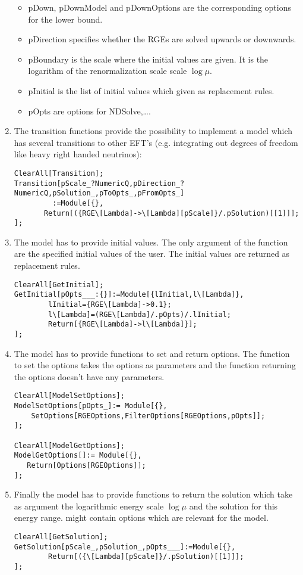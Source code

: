\begin{enumerate}
\begin{itemize}
    \item pDown, pDownModel and pDownOptions are the corresponding options for
    the lower bound.
  \item pDirection specifies whether the RGEs are solved upwards or downwards.
  \item pBoundary is the scale where the initial values are given. It is the
  logarithm of the renormalization scale scale $\log\mu$.
  \item pInitial is the list of initial values which given as replacement rules.
  \item pOpts are options for NDSolve,\dots .
  \end{itemize}

\item The transition functions provide the possibility to implement a model
which has several transitions to other EFT's (e.g. integrating out degrees of freedom like
heavy right handed neutrinos):
\begin{verbatim}
ClearAll[Transition];
Transition[pScale_?NumericQ,pDirection_?NumericQ,pSolution_,pToOpts_,pFromOpts_]
         :=Module[{},
       Return[({RGE\[Lambda]->\[Lambda][pScale]}/.pSolution)[[1]]];
];
\end{verbatim}

\item The model has to provide initial values. The only argument of the function
  are the specified initial values of the user. The initial values are returned as replacement rules.
\begin{verbatim}
ClearAll[GetInitial];
GetInitial[pOpts___:{}]:=Module[{lInitial,l\[Lambda]},
        lInitial={RGE\[Lambda]->0.1};
        l\[Lambda]=(RGE\[Lambda]/.pOpts)/.lInitial;
        Return[{RGE\[Lambda]->l\[Lambda]}];
];
\end{verbatim}

\item The model has to provide functions to set and return options.  The
function to set the options takes the options as parameters and the function
returning the options doesn't have any parameters.
\begin{verbatim}
ClearAll[ModelSetOptions];
ModelSetOptions[pOpts_]:= Module[{},
    SetOptions[RGEOptions,FilterOptions[RGEOptions,pOpts]];
];

ClearAll[ModelGetOptions];
ModelGetOptions[]:= Module[{},
   Return[Options[RGEOptions]];
];
\end{verbatim}

\item Finally the model has to provide functions to return the solution which
  take as argument the logarithmic energy scale $\log\mu$ and the solution for
  this energy range.  might contain options which are relevant for
  the model.

\begin{verbatim}
ClearAll[GetSolution];
GetSolution[pScale_,pSolution_,pOpts___]:=Module[{},
        Return[({\[Lambda][pScale]}/.pSolution)[[1]]];
];
\end{verbatim}

\end{enumerate}

